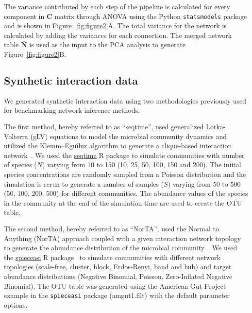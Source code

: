   The variance contributed by each step of the pipeline is calculated for every component in $\mathbf{C}$ matrix through ANOVA using the Python \texttt{statsmodels} package and is shown in Figure~\ref{fig:figure2}A.
  The total variance for the network is calculated by adding the variances for each connection.
  The merged network table $\mathbf{\bar{N}}$ is used as the input to the PCA analysis to generate Figure~\ref{fig:figure2}B.

  \subsection*{Synthetic interaction data}
  \vspace{-5mm}

  We generated synthetic interaction data using two methodologies previously used for benchmarking network inference methods.

  The first method, hereby referred to as ``seqtime'', used generalized Lotka-Volterra (gLV) equations to model the microbial community dynamics and utilized the Klemm–Eguı́luz algorithm to generate a clique-based interaction network~\cite{Rottjers2018}.
  We used the \href{https://github.com/hallucigenia-sparsa/seqtime}{seqtime} R package to simulate communities with number of species ($N$) varying from 10 to 150 (10, 25, 50, 100, 150 and 200).
  The initial species concentrations are randomly sampled from a Poisson distribution and the simulation is rerun to generate a number of samples ($S$) varying from 50 to 500 (50, 100, 200, 500) for different communities.
  The abundance values of the species in the community at the end of the simulation time are used to create the OTU table.

  The second method, hereby referred to as ``NorTA'', used the Normal to Anything (NorTA) approach coupled with a given interaction network topology to generate the abundance distribution of the microbial community~\cite{Kurtz2015}.
  We used the \href{https://github.com/zdk123/SpiecEasi}{spieceasi} R package~\cite{Kurtz2015} to simulate communities with different network topologies (scale-free, cluster, block, Erdos-Renyi, band and hub) and target abundance distributions (Negative Binomial, Poisson, Zero-Inflated Negative Binomial).
  The OTU table was generated using the American Gut Project example in the \texttt{spieceasi} package (amgut1.filt) with the default parameter options.


